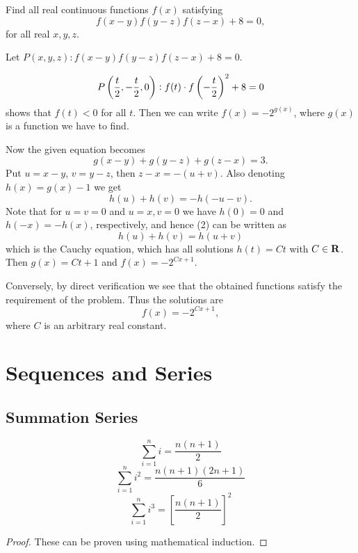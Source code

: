 \begin{prbm}
Find all real continuous functions $f(x)$ satisfying
\[f(x-y)f(y-z)f(z-x)+8=0,\]
for all real $x,y,z$.
\end{prbm}

\begin{solution}
Let $P(x,y,z):f(x-y)f(y-z)f(z-x)+8=0$.

\[P\left(\frac{t}{2},-\frac{t}{2},0\right):f(t)\cdot f\left(-\frac{t}{2}\right)^2+8=0\]
shows that $f(t)<0$ for all $t$. Then we can write $f(x)=-2^{g(x)}$, where $g(x)$ is a function we have to find.

Now the given equation becomes
\begin{equation*}\tag{1}
g(x-y)+g(y-z)+g(z-x)=3.
\end{equation*}
Put $u=x-y$, $v=y-z$, then $z-x=-(u+v)$. Also denoting $h(x)=g(x)-1$ we get
\begin{equation*}\tag{2}
h(u)+h(v)=-h(-u-v).
\end{equation*}
Note that for $u=v=0$ and $u=x,v=0$ we have $h(0)=0$ and $h(-x)=-h(x)$, respectively, and hence (2) can be written as
\[h(u)+h(v)=h(u+v)\]
which is the Cauchy equation, which has all solutions $h(t)=Ct$ with $C\in\mathbf R$. Then $g(x)=Ct+1$ and $f(x)=-2^{Cx+1}$.

Conversely, by direct verification we see that the obtained functions satisfy the requirement of the problem. Thus the solutions are
\[f(x)=-2^{Cx+1},\]
where $C$ is an arbitrary real constant.
\end{solution}

\chapter{Sequences and Series}
\section{Summation Series}
\begin{equation} \sum_{i=1}^{n} i=\frac{n(n+1)}{2} \end{equation}
\begin{equation} \sum_{i=1}^{n} i^2=\frac{n(n+1)(2n+1)}{6} \end{equation}
\begin{equation} \sum_{i=1}^{n} i^3=\left[\frac{n(n+1)}{2}\right]^2 \end{equation}
\begin{proof}
These can be proven using mathematical induction.
\end{proof}

